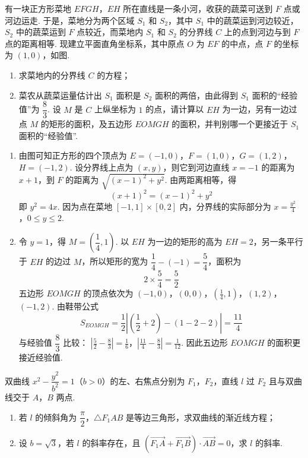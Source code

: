 \begin{problem}

有一块正方形菜地 \(EFGH\)，\(EH\) 所在直线是一条小河，收获的蔬菜可送到 \(F\) 点或河边运走. 于是，菜地分为两个区域 \(S_1\) 和 \(S_2\)，其中 \(S_1\) 中的蔬菜运到河边较近，\(S_2\) 中的蔬菜运到 \(F\) 点较近，而菜地内 \(S_1\) 和 \(S_2\) 的分界线 \(C\) 上的点到河边与到 \(F\) 点的距离相等. 现建立平面直角坐标系，其中原点 \(O\) 为 \(EF\) 的中点，点 \(F\) 的坐标为 \((1,0)\)，如图.

\begin{enumerate}
\item 求菜地内的分界线 \(C\) 的方程；
\item 菜农从蔬菜运量估计出 \(S_1\) 面积是 \(S_2\) 面积的两倍，由此得到 \(S_1\) 面积的“经验值”为 \(\dfrac83\). 设 \(M\) 是 \(C\) 上纵坐标为 \(1\) 的点，请计算以 \(EH\) 为一边，另有一边过点 \(M\) 的矩形的面积，及五边形 \(EOMGH\) 的面积，并判别哪一个更接近于 \(S_1\) 面积的“经验值”.
\end{enumerate}

\end{problem}

\begin{solution}
\begin{enumerate}
\item 由图可知正方形的四个顶点为 \(E=(-1,0)\)，\(F=(1,0)\)，\(G=(1,2)\)，\(H=(-1,2)\). 设分界线上点为 \((x,y)\)，则它到河边直线 \(x=-1\) 的距离为 \(x+1\)，到 \(F\) 的距离为 \(\sqrt{(x-1)^2+y^2}\). 由两距离相等，得
\[
(x+1)^2=(x-1)^2+y^2
\]
即 \(y^2=4x\). 因为点在菜地 \([-1,1]\times[0,2]\) 内，分界线的实际部分为
\(x=\frac{y^2}{4}\)，\(0\le y\le2\).
\item 令 \(y=1\)，得 \(M=\left(\dfrac14,1\right)\). 以 \(EH\) 为一边的矩形的高为 \(EH=2\)，另一条平行于 \(EH\) 的边过 \(M\)，所以矩形的宽为 \(\dfrac14-(-1)=\dfrac54\)，面积为
\[
2\times\frac54=\frac52
\]
五边形 \(EOMGH\) 的顶点依次为 \((-1,0)\)，\((0,0)\)，\((\frac{1}{4},1)\)，\((1,2)\)，\((-1,2)\). 由鞋带公式
\[
S_{EOMGH}=\frac12\left|\left(\frac12+2\right)-\left(1-2-2\right)\right|=\frac{11}{4}
\]
与经验值 \(\dfrac83\) 比较：
\(\left|\frac52-\frac83\right|=\frac16\)，\(\left|\frac{11}{4}-\frac83\right|=\frac1{12}\).
因此五边形 \(EOMGH\) 的面积更接近经验值.
\end{enumerate}
\end{solution}

\begin{problem}

双曲线 \(x^2-\dfrac{y^2}{b^2}=1\)（\(b>0\)）的左、右焦点分别为 \(F_1\)，\(F_2\)，直线 \(l\) 过 \(F_2\) 且与双曲线交于 \(A\)，\(B\) 两点.

\begin{enumerate}
\item 若 \(l\) 的倾斜角为 \(\dfrac{\pi}{2}\)，\(\triangle F_1AB\) 是等边三角形，求双曲线的渐近线方程；
\item 设 \(b=\sqrt3\)，若 \(l\) 的斜率存在，且 \((\overrightarrow{F_1A}+\overrightarrow{F_1B})\cdot\overrightarrow{AB}=0\)，求 \(l\) 的斜率.
\end{enumerate}
\end{problem}

